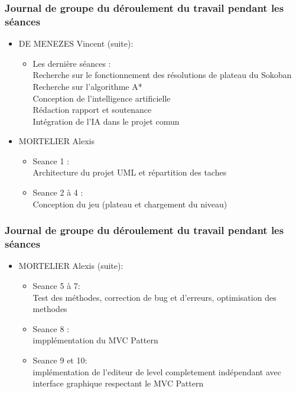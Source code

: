 \documentclass{beamer}
\begin{document}
\begin{frame}
  \frametitle{Journal de groupe du déroulement du travail pendant les séances}
    \begin{itemize}
      \item DE MENEZES Vincent (suite):
      \begin{itemize}
        \item Les dernière séances :\\
          Recherche sur le fonctionnement des résolutions de plateau du Sokoban\\
          Recherche sur l'algorithme A*\\
          Conception de l'intelligence artificielle\\
          Rédaction rapport et soutenance\\
          Intégration de l'IA dans le projet comun\\
      \end{itemize}
      \item MORTELIER Alexis
      \begin{itemize}
        \item Seance 1 :\\
          Architecture du projet UML et répartition des taches
        \item Seance 2 à 4 :\\
          Conception du jeu (plateau et chargement du niveau)
      \end{itemize}
    \end{itemize}
\end{frame}
\begin{frame}
  \frametitle{Journal de groupe du déroulement du travail pendant les séances}
    \begin{itemize}
      \item MORTELIER Alexis (suite):
      \begin{itemize}
        \item Seance 5 à 7:\\
          Test des méthodes, correction de bug et d'erreurs, optimisation des methodes
        \item Seance 8 :\\
          impplémentation du MVC Pattern
        \item Seance 9 et 10:\\
          implémentation de l'editeur de level completement indépendant avec interface graphique respectant le MVC Pattern  
      \end{itemize}
    \end{itemize}
\end{frame}
\end{document}
